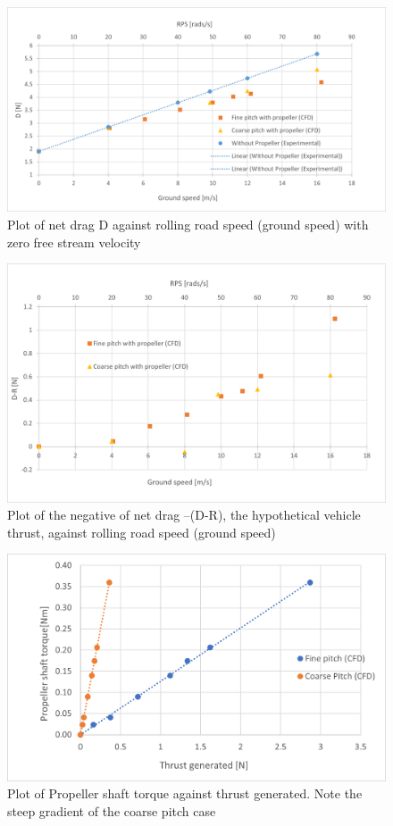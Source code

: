 \begin{figure}[!htbp]
    \centering
    \includegraphics[width = 0.9\linewidth]{images/part10.1/Picture45.png}
    \caption{Plot of net drag D against rolling road speed (ground speed) with zero free stream velocity}
    \label{fig:d}
\end{figure}

\begin{figure}[!htbp]
    \centering
    \includegraphics[width = 0.9\linewidth]{images/part10.1/Picture44.png}
    \caption{Plot of the negative of net drag –(D-R), the hypothetical vehicle thrust, against rolling road speed (ground speed)}
    \label{fig:dminusr}
\end{figure}

\begin{figure}[!htbp]
    \centering
    \includegraphics[width = 0.9\linewidth]{images/part10.1/prop_shaft_torque vs thrust.png}
    \caption{Plot of Propeller shaft torque against thrust generated. Note the steep gradient of the coarse pitch case}
    \label{fig:torquevsthrustprop}
\end{figure}

